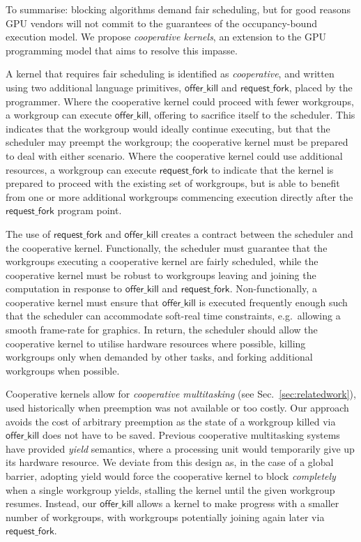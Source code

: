 \documentclass[sigconf]{acmart}
\newcommand{\TSAdded}[1]{#1}
\newcommand{\mysec}{Sec.~}
\newcommand{\offerfork}{\mathsf{request\_fork}}
\newcommand{\offerkill}{\mathsf{offer\_kill}}
\begin{document}
%
To summarise: blocking algorithms
demand fair scheduling,
but for good reasons
GPU vendors will not commit to the guarantees of the
occupancy-bound execution model.
%
We propose \emph{cooperative kernels}, an extension to the GPU
programming model that aims to resolve this impasse.

A kernel
that requires fair scheduling is identified as \emph{cooperative}, and written using two additional
language primitives, $\offerkill$ and $\offerfork$, placed by the programmer.
%
Where the cooperative kernel could proceed with fewer
workgroups, a workgroup can execute $\offerkill$, offering to
sacrifice itself to the scheduler.  This indicates that the workgroup
would ideally continue executing, but that the
scheduler may preempt the workgroup; the cooperative kernel
must be prepared to deal with either scenario.
%
Where the cooperative kernel could use additional resources, a workgroup can execute
$\offerfork$ to indicate that the
kernel is prepared to proceed with the existing set of workgroups, but
is able to benefit from one or more additional workgroups
commencing execution directly after the $\offerfork$ program point.

The use of $\offerfork$ and $\offerkill$ creates a contract between
the scheduler and the cooperative kernel.  Functionally, the scheduler
must guarantee that the workgroups executing a cooperative kernel are
fairly scheduled, while the cooperative kernel must be robust to
workgroups leaving and joining the computation in response to
$\offerkill$ and $\offerfork$.  Non-functionally, a cooperative kernel
must ensure that $\offerkill$ is executed frequently enough such that
the scheduler can accommodate soft-real time constraints,
e.g.\ allowing a smooth frame-rate for graphics.
In return, the scheduler should allow the cooperative kernel to
utilise hardware resources where possible, killing workgroups only
when demanded by other tasks, and forking additional workgroups when
possible.

\TSAdded{Cooperative kernels allow for \emph{cooperative multitasking}
  (see \mysec{\ref{sec:relatedwork}}), used
  historically when preemption was not available or too costly. Our approach avoids the cost of arbitrary
  preemption as the state of a workgroup killed via $\offerkill$ does
  not have to be saved. Previous cooperative multitasking systems have
  provided \emph{yield} semantics, where a processing unit would
  temporarily give up its hardware resource. We deviate from this
  design as, in the case of a global barrier, adopting yield would
  force the cooperative kernel to block \emph{completely} when a single workgroup yields, stalling the kernel until the given
  workgroup resumes.  Instead, our $\offerkill$ allows a kernel to
  make progress with a smaller number of workgroups, with workgroups
  potentially joining again later via $\offerfork$.}
\end{document}
